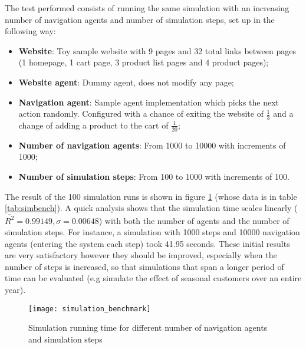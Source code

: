 The test performed consists of running the same simulation with an 
increasing number of navigation agents and number of simulation steps, set up 
in the following way:

\begin{itemize}
    \item \textbf{Website}: Toy sample website with 9 pages and 32 total links 
    between pages (1 homepage, 1 cart page, 3 product list pages and 4 product 
    pages);
    \item \textbf{Website agent}: Dummy agent, does not modify any page;
    \item \textbf{Navigation agent}: Sample agent implementation which 
    picks the next action randomly. Configured with a chance of exiting the 
    website of $\frac{1}{3}$ and a change of adding a product to the cart of 
    $\frac{1}{20}$;
    \item \textbf{Number of navigation agents}: From 1000 to 10000 with 
    increments of 1000;
    \item \textbf{Number of simulation steps}: From 100 to 1000 with increments 
    of 100.
\end{itemize}

The result of the 100 simulation runs is shown in figure \ref{fig:simbench} 
(whose data is in table \ref{tab:simbench}). A quick analysis shows that the 
simulation time scales linearly ($\bar{R^{2}} = 0.99149, \sigma = 0.00648$) 
with both the number of agents and the number of simulation steps. For 
instance, a simulation with 1000 steps and 10000 navigation agents (entering 
the system each step)	 took 41.95 seconds. These initial results are very 
satisfactory however they should be improved, especially when the number of 
steps is increased, so that simulations that span a longer period of time can 
be evaluated (e.g simulate the effect of seasonal customers over an entire 
year).

\begin{figure}[h]
    \begin{center}
        \leavevmode
        \texttt{[image: simulation\_benchmark]}
        \caption{Simulation running time for different number of 
        navigation agents and simulation steps}
        \label{fig:simbench}
    \end{center}
\end{figure}

